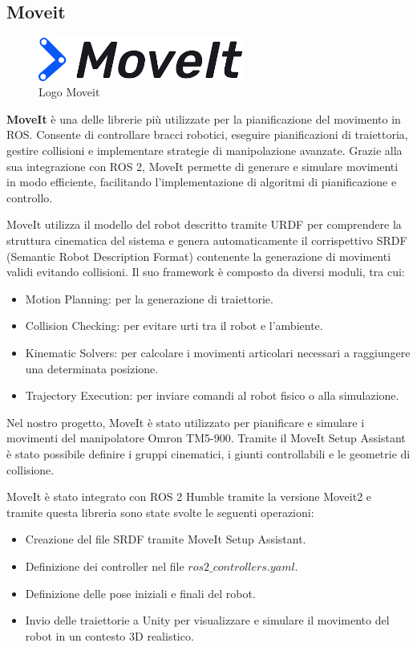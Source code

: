 \documentclass[11pt]{report}
\begin{document}
\subsection{Moveit}
\label{sec:moveit}
\begin{figure}[H]
    \centering
    \includegraphics[width=0.6\textwidth]{images/moveit.png}
    \caption{Logo Moveit}
    \label{fig:moveit}
\end{figure}
\textbf{MoveIt} \cite{Moveit} \cite{Moveit_install} è una delle librerie più utilizzate per la pianificazione del movimento in ROS. Consente di controllare bracci robotici, eseguire pianificazioni di traiettoria, gestire collisioni e implementare strategie di manipolazione avanzate. Grazie alla sua integrazione con ROS 2, MoveIt permette di generare e simulare movimenti in modo efficiente, facilitando l'implementazione di algoritmi di pianificazione e controllo.

MoveIt utilizza il modello del robot descritto tramite URDF per comprendere la struttura cinematica del sistema e genera automaticamente il corrispettivo SRDF (Semantic Robot Description Format) contenente la generazione di movimenti validi evitando collisioni. Il suo framework è composto da diversi moduli, tra cui:
\begin{itemize}
    \item Motion Planning: per la generazione di traiettorie.
    \item Collision Checking: per evitare urti tra il robot e l'ambiente.
    \item Kinematic Solvers: per calcolare i movimenti articolari necessari a raggiungere una determinata posizione.
    \item Trajectory Execution: per inviare comandi al robot fisico o alla simulazione.
\end{itemize}

Nel nostro progetto, MoveIt è stato utilizzato per pianificare e simulare i movimenti del manipolatore Omron TM5-900. Tramite il MoveIt Setup Assistant è stato possibile definire i gruppi cinematici, i giunti controllabili e le geometrie di collisione.

MoveIt è stato integrato con ROS 2 Humble tramite la versione Moveit2 e tramite questa libreria sono state svolte le seguenti operazioni:
\begin{itemize}
    \item Creazione del file SRDF tramite MoveIt Setup Assistant.

    \item Definizione dei controller nel file $ros2\_controllers.yaml$.

    \item Definizione delle pose iniziali e finali del robot.

    \item Invio delle traiettorie a Unity per visualizzare e simulare il movimento del robot in un contesto 3D realistico.
\end{itemize}
\end{document}
